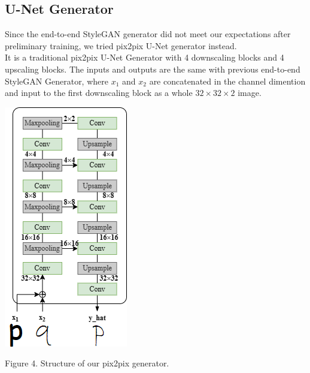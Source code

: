 \documentclass[letterpaper]{article}
\begin{document}
\subsection{U-Net Generator}
Since the end-to-end StyleGAN generator did not meet our expectations after preliminary training, we tried pix2pix U-Net generator instead.
\\
It is a traditional pix2pix U-Net Generator with 4 downscaling blocks and 4 upscaling blocks. The inputs and outputs are the same with previous end-to-end StyleGAN Generator, where $x_1$ and $x_2$ are concatenated in the channel dimention and input to the first downscaling block as a whole $32 \times 32 \times 2$ image.
\\
\begin{center}
    \includegraphics[]{report-fig-model-2.png}

    Figure 4. Structure of our pix2pix generator.
\end{center}
\end{document}
